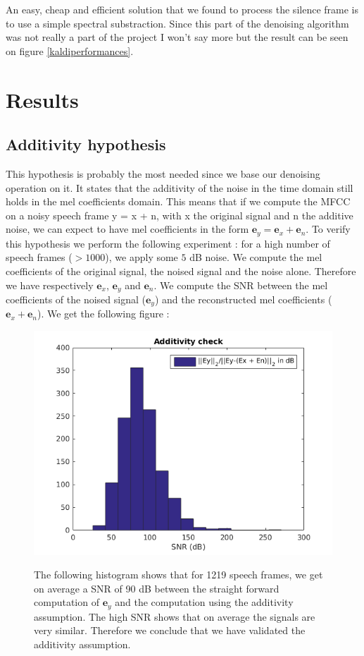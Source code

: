 \documentclass[a4paper]{report}
\newcommand{\ey}{\textbf{e}_y}
\newcommand{\ex}{\textbf{e}_x}
\newcommand{\en}{\textbf{e}_n}
\newcommand{\scale}{0.4}
\begin{document}
An  easy, cheap and efficient solution that we found to process the silence frame is to use a simple spectral substraction.
Since this part of the denoising algorithm was not really a part of the project I won't say more but the result can be seen on figure \ref{kaldiperformances}.



\pagebreak
\section{Results}
\subsection{Additivity hypothesis}
This hypothesis is probably the most needed since we base our denoising operation on it. It states that the additivity of the noise in the time domain still holds in the mel coefficients domain.
This means that if we compute the MFCC on a noisy speech frame y = x + n, with x the original signal and n the additive noise, we can expect to have mel coefficients in the form $\ey= \ex + \en$.
To verify this hypothesis we perform the following experiment : for a high number of speech frames ($ > 1000$), we apply some $5$ dB noise. We compute the mel coefficients of the original signal,
the noised signal and the noise alone. Therefore we have respectively $\ex$, $\ey$ and $\en$. We compute the SNR between the mel coefficients of the noised signal ($\ey$) and the reconstructed
mel coefficients ($\ex + \en$). We get the following figure :
\begin{figure}[!ht]
\centering
\includegraphics[scale=\scale]{additivitycheck}\label{sparsemean}
\caption{The following histogram shows that for 1219 speech frames, we get on average a SNR of 90 dB between the straight forward computation of $\ey$ and the computation 
using the additivity assumption. The high SNR shows that on average the signals are very similar. Therefore we conclude that we have validated the additivity assumption.}
\label{additivitycheck}
\end{figure}
\end{document}
